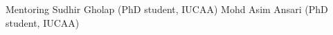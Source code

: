\begin{rubric}{Mentoring}
\entry*[] Sudhir Gholap (PhD student, IUCAA)
%
\entry*[] Mohd Asim Ansari (PhD student, IUCAA)
%

\end{rubric}
